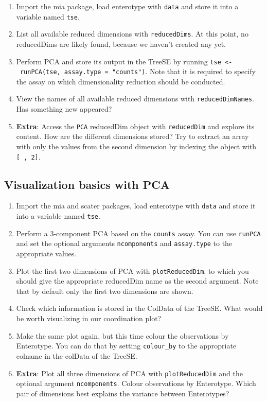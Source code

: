 \documentclass[
]{book}
\providecommand{\tightlist}{%
  \setlength{\itemsep}{0pt}\setlength{\parskip}{0pt}}
\begin{document}
\begin{enumerate}
\def\labelenumi{\arabic{enumi}.}
\tightlist
\item
  Import the mia package, load enterotype with \texttt{data} and store it into a
  variable named \texttt{tse}.
\item
  List all available reduced dimensions with \texttt{reducedDims}. At this point, no
  reducedDims are likely found, because we haven't created any yet.
\item
  Perform PCA and store its output in the TreeSE by running
  \texttt{tse\ \textless{}-\ runPCA(tse,\ assay.type\ =\ "counts")}. Note that it is required to
  specify the assay on which dimensionality reduction should be conducted.
\item
  View the names of all available reduced dimensions with \texttt{reducedDimNames}.
  Has something new appeared?
\item
  \textbf{Extra}: Access the \texttt{PCA} reducedDim object with \texttt{reducedDim} and explore
  its content. How are the different dimensions stored? Try to extract an
  array with only the values from the second dimension by indexing the object
  with \texttt{{[}\ ,\ 2{]}}.
\end{enumerate}

\hypertarget{visualization-basics-with-pca}{%
\subsection{Visualization basics with PCA}\label{visualization-basics-with-pca}}

\begin{enumerate}
\def\labelenumi{\arabic{enumi}.}
\tightlist
\item
  Import the mia and scater packages, load enterotype with \texttt{data} and store it
  into a variable named \texttt{tse}.
\item
  Perform a 3-component PCA based on the \texttt{counts} assay. You can use \texttt{runPCA}
  and set the optional arguments \texttt{ncomponents} and \texttt{assay.type} to the
  appropriate values.
\item
  Plot the first two dimensions of PCA with \texttt{plotReducedDim}, to which you
  should give the appropriate reducedDim name as the second argument. Note that
  by default only the first two dimensions are shown.
\item
  Check which information is stored in the ColData of the TreeSE. What would
  be worth visualizing in our coordination plot?
\item
  Make the same plot again, but this time colour the observations by Enterotype.
  You can do that by setting \texttt{colour\_by} to the appropriate colname in the
  colData of the TreeSE.
\item
  \textbf{Extra}: Plot all three dimensions of PCA with \texttt{plotReducedDim} and the
  optional argument \texttt{ncomponents}. Colour observations by Enterotype. Which
  pair of dimensions best explains the variance between Enterotypes?
\end{enumerate}
\end{document}
